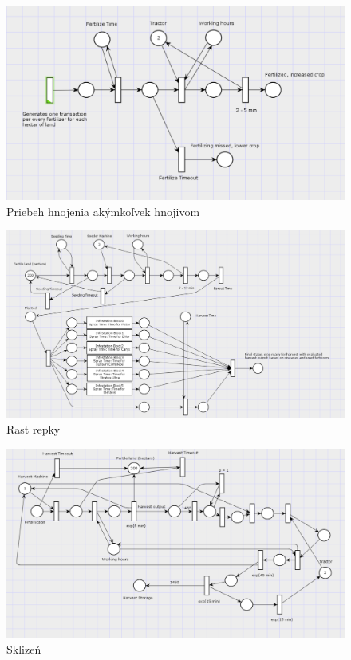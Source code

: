 \documentclass[11pt,a4paper,titlepage]{article}
\begin{document}
\begin{figure}[ht!]
\centering
\includegraphics[scale=0.3]{img/Fertilization.png}
\caption{Priebeh hnojenia akýmkoľvek hnojivom}
\end{figure}

\begin{figure}[ht!]
\centering
\includegraphics[scale=0.25]{img/Growing.png}
\caption{Rast repky}
\end{figure}

\begin{figure}[ht!]
\centering
\includegraphics[scale=0.25]{img/Harvest.png}
\caption{Sklizeň}
\end{figure}
\end{document}
